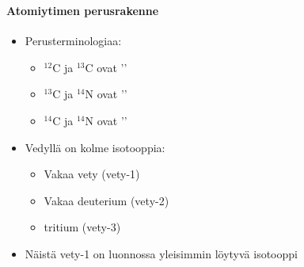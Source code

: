 \begin{frame}
\frametitle{\texorpdfstring{\culine[\sectiontitleulinecolor]{\sectiontitle}}{\sectiontitle} }
\framesubtitle{Atomiytimen perusrakenne}%
\appear{} 

\begin{minipage}{6.5cm}
\begin{itemize} \seminormal
\item Perusterminologiaa:
	\begin{itemize}
	 \item ${ }^{12} \mathrm{C}$ ja ${ }^{13} \mathrm{C}$ ovat '' 
	\item ${ }^{13} \mathrm{C}$ ja ${ }^{14} \mathrm{N}$ ovat '' 
	\item ${ }^{14} \mathrm{C}$ ja ${ }^{14} \mathrm{N}$ ovat ''
\end{itemize}

	
	\item Vedyllä on kolme isotooppia:
	\begin{itemize}
		\item Vakaa vety (vety-1)
		\item Vakaa deuterium (vety-2)
		\item {} tritium (vety-3)
	\end{itemize}

\item Näistä vety-1 on luonnossa yleisimmin löytyvä isotooppi 

\end{itemize}
\end{minipage}




\end{frame}
